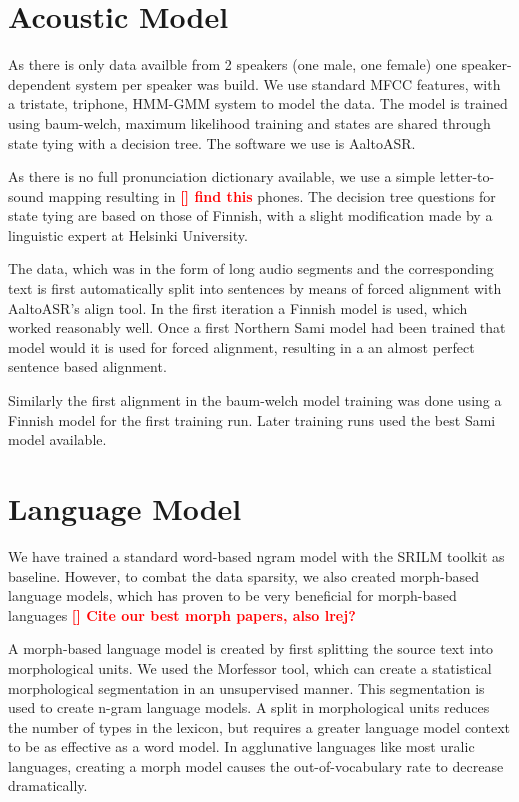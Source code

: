\documentclass[10pt,b5paper,utf8]{article}
\newcommand{\todo}[2]{{\textcolor{red}{\bf [#1] #2 }}}
\begin{document}
\section{Acoustic Model}
As there is only data availble from 2 speakers (one male, one female) one speaker-dependent system per speaker was build. We use standard MFCC features, with  a tristate, triphone, HMM-GMM system to model the data. The model is trained using baum-welch, maximum likelihood training and states are shared through state tying with a decision tree. The software we use is AaltoASR.

As there is no full pronunciation dictionary available, we use a simple letter-to-sound mapping resulting in \todo{}{find this} phones. The decision tree questions for state tying are based on those of Finnish, with a slight modification made by a linguistic expert at Helsinki University.

The data, which was in the form of long audio segments and the corresponding text is first automatically split into sentences by means of forced alignment with AaltoASR's align tool. In the first iteration a Finnish model is used, which worked reasonably well. Once a first Northern Sami model had been trained that model would it is used for forced alignment, resulting in a an almost perfect sentence based alignment.

Similarly the first alignment in the baum-welch model training was done using a Finnish model for the first training run. Later training runs used the best Sami model available.





\section{Language Model}
We have trained a standard word-based ngram model with the SRILM toolkit as baseline. However, to combat the data sparsity, we also created morph-based language models, which has proven to be very beneficial for morph-based languages \todo{}{Cite our best morph papers, also lrej?}

A morph-based language model is created by first splitting the source text into morphological units. We used the Morfessor tool, which can create a statistical morphological segmentation in an unsupervised manner. This segmentation is used to create n-gram language models. A split in morphological units reduces the number of types in the lexicon, but requires a greater language model context to be as effective as a word model. In agglunative languages like most uralic languages, creating a morph model causes the out-of-vocabulary rate to decrease dramatically.
\end{document}
